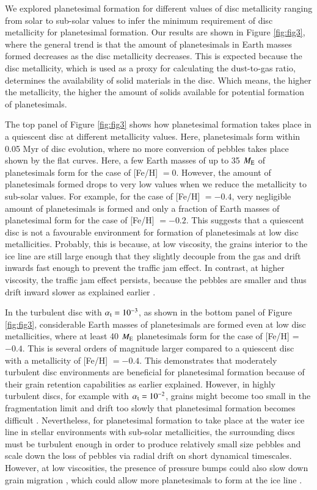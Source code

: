 \documentclass{aa}
\begin{document}
We explored planetesimal formation for different values of disc metallicity ranging from solar to sub-solar values to infer the minimum requirement of disc metallicity for planetesimal formation. Our results are shown in Figure \ref{fig:fig3}, where the general trend is that the amount of planetesimals in Earth masses formed decreases as the disc metallicity decreases. This is expected because the disc metallicity, which is used as a proxy for calculating the dust-to-gas ratio, determines  the availability of solid materials in the disc. Which means, the higher the metallicity, the higher the amount of solids available for potential formation of planetesimals.  

The top panel of Figure \ref{fig:fig3}  shows how planetesimal formation takes place in a quiescent disc at different metallicity values.  Here, planetesimals form within 0.05 Myr of disc evolution, where no more conversion of pebbles takes place shown by the flat curves.  Here, a few Earth masses of up to 35 $M_{\rm{E}}$ of planetesimals form for the case of [Fe/H] $= 0$.  However, the amount of planetesimals formed drops to very low values when we reduce the metallicity to sub-solar values. For example, for the case of [Fe/H] $=-0.4$, very negligible amount of planetesimals is formed and only a fraction of Earth masses of planetesimal form for the case of [Fe/H] $=-0.2$. This suggests that a quiescent disc is not a favourable environment for formation of planetesimals at low disc metallicities. Probably, this is because, at low viscosity, the grains interior to the ice line are still large enough that they slightly decouple from the gas and drift inwards fast enough to prevent the traffic jam effect. In contrast, at higher viscosity, the traffic jam effect persists, because the pebbles are smaller and thus drift inward slower as explained earlier \citep[see also][]{BitschMah2023}.


In the turbulent disc with $\alpha_{\rm t}=10^{-3}$, as shown in the bottom panel of Figure \ref{fig:fig3}, considerable Earth masses of planetesimals are formed even at low disc metallicities, where at least 40 $M_{\rm{E}}$ planetesimals form for the case of [Fe/H] = $-0.4$. This is several orders of magnitude larger compared to a quiescent disc with a metallicity of [Fe/H] $= -0.4$.  This demonstrates that moderately turbulent disc environments are beneficial for planetesimal formation because of their grain retention capabilities as earlier explained. However, in highly turbulent discs, for example with $\alpha_{\rm t}=10^{-2}$, grains might become too small in the fragmentation limit and drift too slowly that planetesimal formation becomes difficult \citep[e.g.,][]{DrazkowskaAlibert2017}.  Nevertheless, for planetesimal formation to take place at the water ice line in stellar environments with sub-solar metallicities, the surrounding discs must be turbulent enough in order to produce relatively small size pebbles and scale down the loss of pebbles via radial drift on short dynamical timescales. However, at low viscosities, the presence of pressure bumps could also slow down grain migration \citep{Pinilla2012, Andama2022}, which could allow more planetesimals to form at the ice line \citep[e.g.,][]{Stammler2019}.
\end{document}
